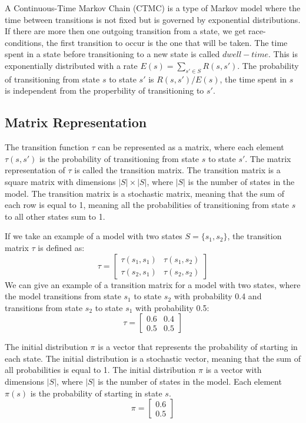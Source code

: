 A Continuous-Time Markov Chain (CTMC) is a type of Markov model where the time between transitions is not fixed but is governed by exponential distributions. If there are more then one outgoing transition from a state, we get race-conditions, the first transition to occur is the one that will be taken. The time spent in a state before transitioning to a new state is called $dwell-time$. This is exponentially distributed with a rate $E(s) = \sum_{s' \in S} R(s, s')$. The probability of transitioning from state $s$ to state $s'$ is $R(s, s')/E(s)$, the time spent in $s$ is independent from the properbility of transitioning to $s'$.

\subsection{Matrix Representation}
The transition function $\tau$ can be represented as a matrix, where each element $\tau(s, s')$ is the probability of transitioning from state $s$ to state $s'$. The matrix representation of $\tau$ is called the transition matrix. The transition matrix is a square matrix with dimensions $|S| \times |S|$, where $|S|$ is the number of states in the model. The transition matrix is a stochastic matrix, meaning that the sum of each row is equal to 1, meaning all the probabilities of transitioning from state $s$ to all other states sum to 1.

If we take an example of a model with two states $S = \{s_1, s_2\}$, the transition matrix $\tau$ is defined as:
\begin{equation}
    \tau = \begin{bmatrix}
        \tau(s_1, s_1) & \tau(s_1, s_2) \\
        \tau(s_2, s_1) & \tau(s_2, s_2)
    \end{bmatrix}
\end{equation}
We can give an example of a transition matrix for a model with two states, where the model transitions from state $s_1$ to state $s_2$ with probability 0.4 and transitions from state $s_2$ to state $s_1$ with probability 0.5:
\begin{equation}
    \tau = \begin{bmatrix}
        0.6 & 0.4 \\
        0.5 & 0.5
    \end{bmatrix}
\end{equation}

The initial distribution $\pi$ is a vector that represents the probability of starting in each state. The initial distribution is a stochastic vector, meaning that the sum of all probabilities is equal to 1. The initial distribution $\pi$ is a vector with dimensions $|S|$, where $|S|$ is the number of states in the model. Each element $\pi(s)$ is the probability of starting in state $s$.
\begin{equation}
    \pi = \begin{bmatrix}
        0.6 \\
        0.5
    \end{bmatrix}
\end{equation}

